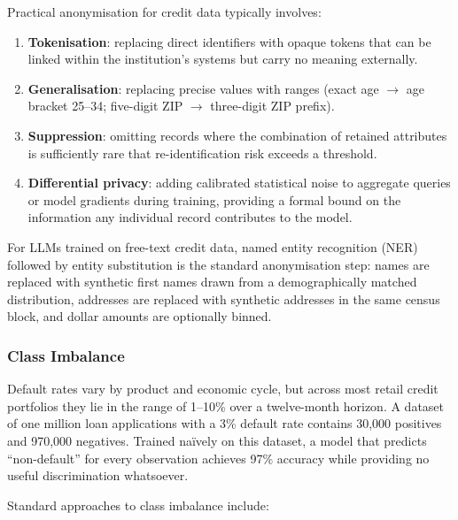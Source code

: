 \begin{context}
Practical anonymisation for credit data typically involves:
\begin{enumerate}
  \item \textbf{Tokenisation}: replacing direct identifiers with opaque tokens that can be linked within the institution's systems but carry no meaning externally.
  \item \textbf{Generalisation}: replacing precise values with ranges (exact age $\to$ age bracket 25--34; five-digit ZIP $\to$ three-digit ZIP prefix).
  \item \textbf{Suppression}: omitting records where the combination of retained attributes is sufficiently rare that re-identification risk exceeds a threshold.
  \item \textbf{Differential privacy}: adding calibrated statistical noise to aggregate queries or model gradients during training, providing a formal bound on the information any individual record contributes to the model.
\end{enumerate}

For LLMs trained on free-text credit data, named entity recognition (NER) followed by entity substitution is the standard anonymisation step: names are replaced with synthetic first names drawn from a demographically matched distribution, addresses are replaced with synthetic addresses in the same census block, and dollar amounts are optionally binned.

\subsubsection*{Class Imbalance}

Default rates vary by product and economic cycle, but across most retail credit portfolios they lie in the range of 1--10\% over a twelve-month horizon. A dataset of one million loan applications with a 3\% default rate contains 30,000 positives and 970,000 negatives. Trained na\"{i}vely on this dataset, a model that predicts ``non-default'' for every observation achieves 97\% accuracy while providing no useful discrimination whatsoever.

Standard approaches to class imbalance include:


\end{context}
